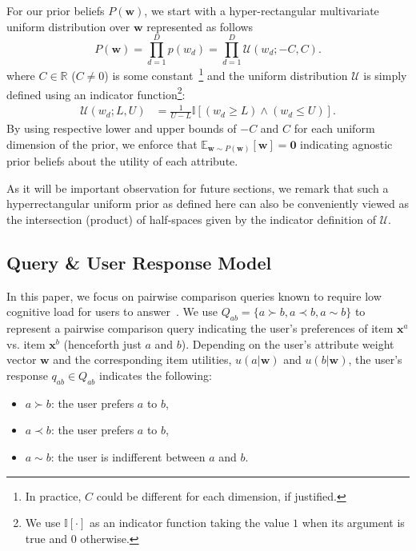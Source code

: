 \documentclass[letterpaper]{article}
\newcommand{\E}{\mathbb{E}}
\newcommand{\I}{\mathbb{I}}
\newcommand{\R}{\mathbb{R}}
\newcommand{\U}{\mathcal{U}}
\renewcommand{\vec}[1]{\mathbf{#1}}
\begin{document}
For our prior beliefs $P(\vec{w})$, we start with a hyper-rectangular
multivariate uniform distribution over $\vec{w}$ represented
as follows
\begin{equation} \label{eq:prior}
P(\vec{w}) = \prod_{d=1}^{D} p(w_{d})
           = \prod_{d=1}^{D} \U(w_{d};-C,C).
\end{equation}
where $C \in \R$ ($C \neq 0$) is some constant~\footnote{In
practice, $C$ could be different for each dimension, if justified.}
and the uniform distribution $\U$ is simply defined using an indicator
function\footnote{We use $\I[\cdot]$ as an indicator function taking
the value $1$ when its argument is true and $0$ otherwise.}:
\begin{align*}
\U(w_d;L,U) & = \frac{1}{U-L} \I[(w_d \geq L) \land (w_d \leq U)].
\end{align*}
By using respective lower and upper bounds of
$-C$ and $C$ for each uniform dimension of the prior, we enforce that
$\E_{\vec{w} \sim P(\vec{w})}[\vec{w}] = \vec{0}$ indicating agnostic
prior beliefs about the utility of each attribute.  

As it will be important observation for future sections, we remark
that such a hyperrectangular uniform prior as defined here can also be
conveniently viewed as the intersection (product) of half-spaces given
by the indicator definition of $\U$.

\subsection{Query \& User Response Model}

\label{sec:query_and_user_model}

In this paper, we focus on pairwise comparison queries known to
require low cognitive load for users to answer~\cite{conitzer09161}.
We use $Q_{ab} = \{ a \succ b, a \prec b, a \sim b \}$ to represent a
pairwise comparison query indicating the user's preferences of item
$\vec{x}^a$ vs. item $\vec{x}^b$ (henceforth just $a$ and $b$).
Depending on the user's attribute weight vector $\vec{w}$ and the
corresponding item utilities, $u(a|\vec{w})$ and $u(b|\vec{w})$, the
user's response $q_{ab} \in Q_{ab}$ indicates the following:
\begin{itemize}
\item $a \succ b$: the user prefers $a$ to $b$,
\item $a \prec b$: the user prefers $a$ to $b$,
\item $a \sim b$:  the user is indifferent between $a$ and $b$.
\end{itemize}
\end{document}
